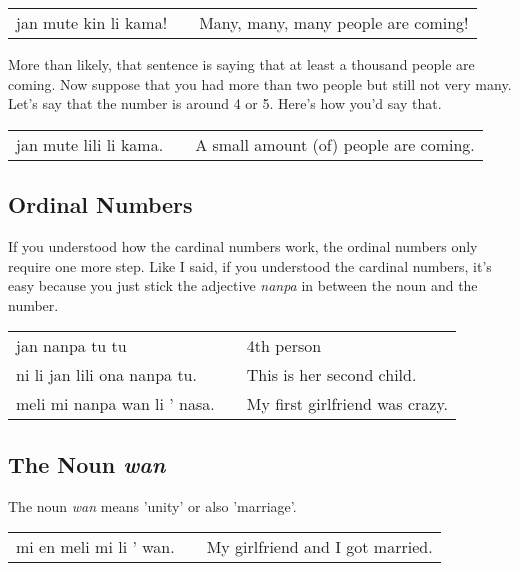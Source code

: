 \begin{supertabular}{p{5,5cm}|ll}
jan mute kin li kama! && Many, many, many people are coming! \\
\end{supertabular} 

More than likely, that sentence is saying that at least a thousand people are coming.  
Now suppose that you had more than two people but still not very many. 
Let's say that the number is around 4 or 5. Here's how you'd say that. 

\begin{supertabular}{p{5,5cm}|ll}
jan mute lili li kama. && A small amount (of) people are coming. \\
\end{supertabular} 
%
%
\subsection*{Ordinal Numbers}
%
%
If you understood how the cardinal numbers work, the ordinal numbers only require one more step. 
Like I said, if you understood the cardinal numbers, it's easy because you just stick the adjective \textit{nanpa} in between the noun and the number. 

\begin{supertabular}{p{5,5cm}|ll}
jan nanpa tu tu && 4th person \\
ni li jan lili ona nanpa tu. && This is her second child. \\
meli mi nanpa wan li ' nasa. && My first girlfriend was crazy. \\
\end{supertabular} 

%
\subsection*{The Noun \textit{wan}}
%
%
The noun \textit{wan} means 'unity' or also 'marriage'.

\begin{supertabular}{p{5,5cm}|ll}
mi en meli mi li ' wan. && My girlfriend and I got married. \\
\end{supertabular} 

